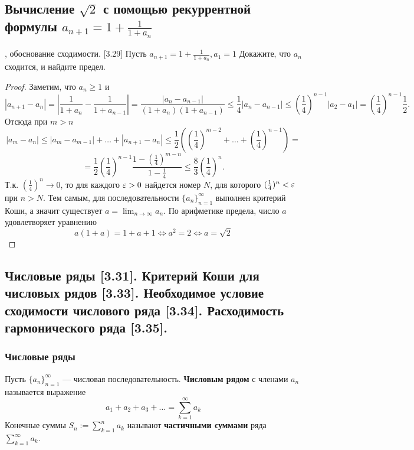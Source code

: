 \documentclass[12pt, a4paper]{article}
\begin{document}
    \subsection{Вычисление $\sqrt{2}$ с помощью рекуррентной формулы $a_{n+1} = 1 + \frac{1}{1 + a_n}$}, обоснование сходимости. [3.29]
    Пусть $a_{n+1} = 1 + \frac{1}{1 + a_n}, a_1 = 1$ Докажите, что $a_n$ сходится, и найдите предел. 
    \begin{proof}
    Заметим, что $a_n \geq 1$ и 
    \begin{equation*}
        |a_{n+1} - a_n| = \left|\frac{1}{1 + a_n} - \frac{1}{1 + a_{n-1}}\right| = \frac{|a_n - a_{n-1}|}{(1 + a_n)(1 + a_{n-1})} \leq \frac{1}{4} |a_n - a_{n-1}| \leq \left(\frac{1}{4}\right)^{n-1} |a_2 - a_1| = \left(\frac{1}{4}\right)^{n-1} \frac{1}{2}.
    \end{equation*}
    Отсюда при $m > n$
    \begin{equation*}
        |a_m - a_n| \leq |a_m - a_{m-1}| + \dots + |a_{n + 1} - a_n| \leq \frac{1}{2}\left(\left(\frac{1}{4}\right)^{m-2} + \dots + \left(\frac{1}{4}\right)^{n-1}\right) = 
    \end{equation*}
    \begin{equation*}
        = \frac{1}{2} \left(\frac{1}{4}\right)^{n-1} \frac{1 - (\frac{1}{4})^{m-n}}{1 - \frac{1}{4}} \leq \frac{8}{3} \left(\frac{1}{4}\right)^n.
    \end{equation*}
    Т.к. $(\frac{1}{4})^n \to 0$, то для каждого $\varepsilon > 0$ найдется номер $N$, для которого $(\frac{1}{4})^n < \varepsilon$ при $n > N$. Тем самым, для последовательности $\{a_n\}^{\infty}_{n=1}$ выполнен критерий Коши, а значит существует $a = \lim_{n \to \infty} a_n$. По арифметике предела, число $a$ удовлетворяет уравнению
    \begin{equation*}
        a(1 + a) = 1 + a + 1 \Longleftrightarrow a^2 = 2 \Longleftrightarrow a = \sqrt{2}
    \end{equation*}
    \end{proof}
    \subsection{Числовые ряды [3.31]. Критерий Коши для числовых рядов [3.33]. Необходимое условие сходимости числового ряда [3.34]. Расходимость гармонического ряда [3.35].}
    \subsubsection{Числовые ряды}
     Пусть $\{a_n\}^{\infty}_{n=1}$ --- числовая последовательность. \textbf{Числовым рядом} с членами $a_n$ называется выражение 
    \begin{equation*}
        a_1 + a_2 + a_3 + \dots = \sum_{k=1}^{\infty} a_k
    \end{equation*}
    Конечные суммы $S_n := \sum_{k=1}^{n} a_k$ называют \textbf{частичными суммами} ряда $\sum_{k=1}^{\infty} a_k$.
\end{document}

